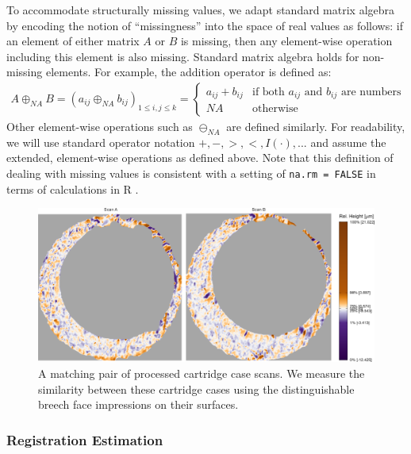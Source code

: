 \documentclass[preprint]{JASA}
\begin{document}
To accommodate structurally missing values, we adapt standard matrix
algebra by encoding the notion of ``missingness'' into the space of real
values as follows: if an element of either matrix \(A\) or \(B\) is
missing, then any element-wise operation including this element is also
missing. Standard matrix algebra holds for non-missing elements. For
example, the addition operator is defined as: \begin{align*}
A \oplus_{NA} B = (a_{ij} \oplus_{NA} b_{ij})_{1 \leq i,j \leq k} = 
\begin{cases}
a_{ij} + b_{ij} & \text{if both $a_{ij}$ and $b_{ij}$ are numbers} \\
NA &\text{otherwise}
\end{cases}
\end{align*} Other element-wise operations such as \(\ominus_{NA}\) are
defined similarly. For readability, we will use standard operator
notation \(+, -, >, <, I(\cdot), ...\) and assume the extended,
element-wise operations as defined above. Note that this definition of
dealing with missing values is consistent with a setting of
\texttt{na.rm\ =\ FALSE} in terms of calculations in R
\citep{Rlanguage}.

\begin{figure}[htbp]
\includegraphics[width=\textwidth]{figures/matchPair} \caption{\label{fig:matchPair} A matching pair of processed cartridge case scans. We measure the similarity between these cartridge cases using the distinguishable breech face impressions on their surfaces.}\label{fig:unnamed-chunk-5}
\end{figure}

\hypertarget{registration-estimation}{%
\subsubsection{Registration Estimation}\label{registration-estimation}}
\end{document}
